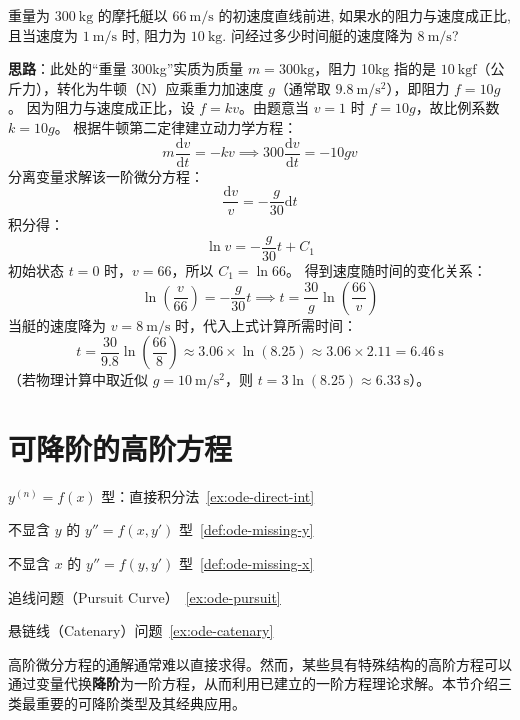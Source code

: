 \documentclass[lang=cn,11pt]{elegantbook}
\begin{document}
\begin{exercise}[变加速直线运动的积分]
重量为 $300\ \mathrm{kg}$ 的摩托艇以 $66\ \mathrm{m/s}$ 的初速度直线前进, 如果水的阻力与速度成正比, 且当速度为 $1\ \mathrm{m/s}$ 时, 阻力为 $10\ \mathrm{kg}$. 问经过多少时间艇的速度降为 $8\ \mathrm{m/s}$?
\end{exercise}
\begin{solution}
\textbf{思路}：此处的“重量 300kg”实质为质量 $m = 300 \mathrm{kg}$，阻力 10kg 指的是 $10\ \mathrm{kgf}$（公斤力），转化为牛顿（$\mathrm{N}$）应乘重力加速度 $g$（通常取 $9.8\ \mathrm{m/s^2}$），即阻力 $f = 10g$。
因为阻力与速度成正比，设 $f = kv$。由题意当 $v=1$ 时 $f=10g$，故比例系数 $k=10g$。
根据牛顿第二定律建立动力学方程：
\[
m\frac{\mathrm{d}v}{\mathrm{d}t} = -kv \implies 300\frac{\mathrm{d}v}{\mathrm{d}t} = -10g v
\]
分离变量求解该一阶微分方程：
\[
\frac{\mathrm{d}v}{v} = -\frac{g}{30}\mathrm{d}t
\]
积分得：
\[
\ln v = -\frac{g}{30}t + C_1
\]
初始状态 $t=0$ 时，$v=66$，所以 $C_1 = \ln 66$。
得到速度随时间的变化关系：
\[
\ln\left(\frac{v}{66}\right) = -\frac{g}{30}t \implies t = \frac{30}{g} \ln\left(\frac{66}{v}\right)
\]
当艇的速度降为 $v=8\ \mathrm{m/s}$ 时，代入上式计算所需时间：
\[
t = \frac{30}{9.8} \ln\left(\frac{66}{8}\right) \approx 3.06 \times \ln(8.25) \approx 3.06 \times 2.11 = 6.46\ \mathrm{s}
\]
（若物理计算中取近似 $g=10\ \mathrm{m/s^2}$，则 $t = 3 \ln(8.25) \approx 6.33\ \mathrm{s}$）。
\end{solution}

\section{可降阶的高阶方程}

\begin{introduction}
  \item $y^{(n)}=f(x)$ 型：直接积分法~\ref{ex:ode-direct-int}
  \item 不显含 $y$ 的 $y''=f(x,y')$ 型~\ref{def:ode-missing-y}
  \item 不显含 $x$ 的 $y''=f(y,y')$ 型~\ref{def:ode-missing-x}
  \item 追线问题（Pursuit Curve）~\ref{ex:ode-pursuit}
  \item 悬链线（Catenary）问题~\ref{ex:ode-catenary}
\end{introduction}

高阶微分方程的通解通常难以直接求得。然而，某些具有特殊结构的高阶方程可以通过变量代换\textbf{降阶}为一阶方程，从而利用已建立的一阶方程理论求解。本节介绍三类最重要的可降阶类型及其经典应用。
\end{document}

